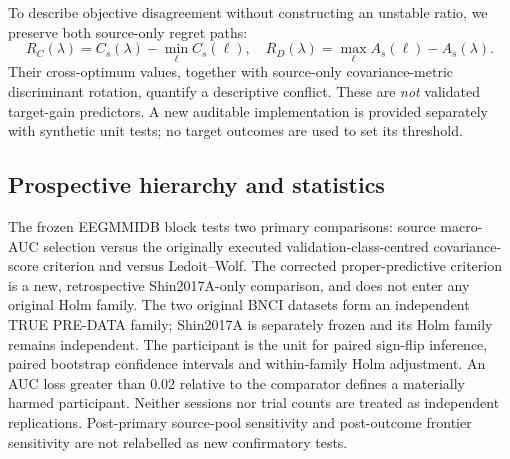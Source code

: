 \documentclass[11pt,a4paper]{article}
\begin{document}
To describe objective disagreement without constructing an unstable ratio,
we preserve both source-only regret paths:
\[
 R_C(\lambda)=C_s(\lambda)-\min_\ell C_s(\ell),\quad
 R_D(\lambda)=\max_\ell A_s(\ell)-A_s(\lambda).
\]
Their cross-optimum values, together with source-only covariance-metric
discriminant rotation, quantify a descriptive conflict.
These are \emph{not} validated target-gain predictors. A new auditable
implementation is provided separately with synthetic unit tests; no
target outcomes are used to set its threshold.







\subsection{Prospective hierarchy and statistics}
The frozen EEGMMIDB block tests two primary comparisons: source macro-AUC
selection versus the originally executed validation-class-centred
covariance-score criterion and versus Ledoit--Wolf. The corrected
proper-predictive criterion is a new, retrospective Shin2017A-only
comparison, and does not enter any original Holm family.
The two original BNCI datasets form an independent TRUE PRE-DATA family;
Shin2017A is separately frozen and its Holm family remains independent.
The participant is the unit for paired sign-flip inference, paired bootstrap
confidence intervals and within-family Holm adjustment. An AUC loss
greater than 0.02 relative to the comparator defines a materially harmed
participant. Neither sessions nor trial counts are treated as independent
replications. Post-primary source-pool sensitivity and post-outcome frontier
sensitivity are not relabelled as new confirmatory tests.


\end{document}
